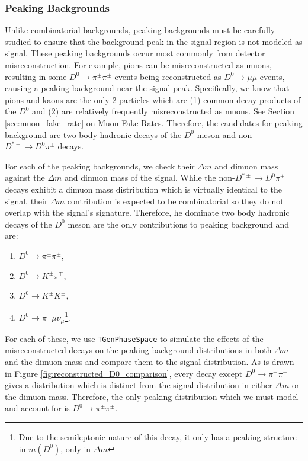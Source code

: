 \subsubsection{Peaking Backgrounds}

Unlike combinatorial backgrounds, peaking backgrounds must be carefully studied to ensure that the background peak in the signal region is not modeled as signal. These peaking backgrounds occur most commonly from detector misreconstruction. For example, pions can be misreconstructed as muons, resulting in some $D^0 \to \pi^\pm \pi^\pm$ events being reconstructed as $D^0 \to \mu \mu$ events, causing a peaking background near the signal peak. Specifically, we know that pions and kaons are the only 2 particles which are (1) common decay products of the $D^0$ and (2) are relatively frequently misreconstructed as muons. See Section \ref{sec:muon_fake_rate} on Muon Fake Rates. Therefore, the candidates for peaking background are two body hadronic decays of the $D^0$ meson and non-$D^{*\pm} \to D^0 \pi^\pm$ decays. 

For each of the peaking backgrounds, we check their $\Delta m$ and dimuon mass against the $\Delta m$ and dimuon mass of the signal. While the non-$D^{*\pm} \to D^0 \pi^\pm$ decays exhibit a dimuon mass distribution which is virtually identical to the signal, their $\Delta m$ contribution is expected to be combinatorial so they do not overlap with the signal's signature. Therefore, he dominate two body hadronic decays of the $D^0$ meson are the only contributions to peaking background and are:
\begin{enumerate}
    \item $D^0 \to \pi^\pm \pi^\pm$,
    \item $D^0 \to K^\pm \pi^\mp$,
    \item $D^0 \to K^\pm K^\pm$,
    \item $D^0 \to \pi^\pm \mu \nu_\mu$\footnote{Due to the semileptonic nature of this decay, it only has a peaking structure in $m(D^0)$, only in $\Delta m$}.
\end{enumerate}
For each of these, we use \texttt{TGenPhaseSpace} to simulate the effects of the misreconstructed decays on the peaking background distributions in both $\Delta m$ and the dimuon mass and compare them to the signal distribution. As is drawn in Figure \ref{fig:reconstructed_D0_comparison}, every decay except $D^0 \to \pi^\pm \pi^\pm$ gives a distribution which is distinct from the signal distribution in either $\Delta m$ or the dimuon mass. Therefore, the only peaking distribution which we must model and account for is $D^0 \to \pi^\pm \pi^\pm$. 

